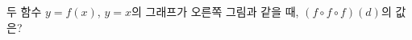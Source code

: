 \noindent\begin{minipage}[t]{0.58\linewidth}\vspace{0pt}\raggedright 두 함수 $y=f(x)$, $y=x$의 그래프가 오른쪽 그림과 같을 때, $(f\circ f\circ f)(d)$의 값은?\end{minipage}\hfill\begin{minipage}[t]{0.4\linewidth}\vspace{0pt}\centering \resizebox{\ifdim\width>\linewidth\linewidth\else\width\fi}{!}{}\end{minipage}\par
{}
